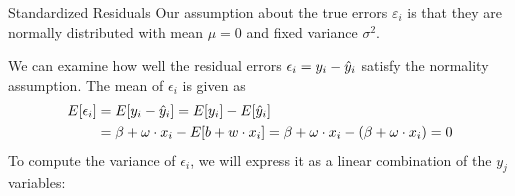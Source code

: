 \begin{frame}{Standardized Residuals}
Our assumption about the true errors $\varepsilon_i$ is that they are
normally distributed with mean $\mu = 0$ and fixed variance $\sigma^2$. 

\medskip

We can examine how well the residual
errors $\epsilon_i = y_i - \hat{y}_i$ satisfy the normality assumption.
%
The mean of $\epsilon_i$ is given as
\begin{align*}
    E[\epsilon_i] & = E[y_i - \hat{y}_i] = E[y_i] - E[\hat{y}_i]\\
    & = \beta + \omega \cdot x_i - E[b + w \cdot x_i] = 
    \beta + \omega \cdot x_i - (\beta + \omega \cdot x_i) = 0 
\end{align*}
%
To compute the variance of $\epsilon_i$, we will express it as a linear
combination of the $y_{\!j}$ variables:%

\end{frame}
